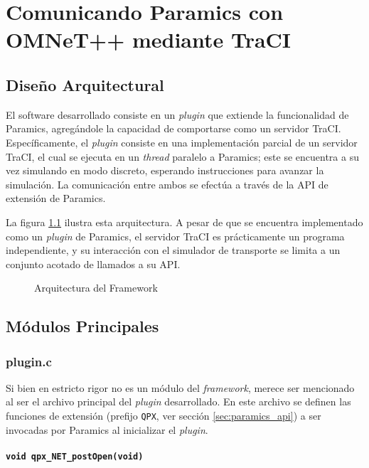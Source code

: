 \chapter{Comunicando Paramics con OMNeT++ mediante TraCI}
\section{Diseño Arquitectural}\label{sec:architecture}

El software desarrollado consiste en un \emph{plugin} que extiende la funcionalidad de Paramics, agregándole la capacidad de comportarse como un servidor TraCI. Específicamente, el \emph{plugin} consiste en una implementación parcial de un servidor TraCI, el cual se ejecuta en un \emph{thread} paralelo a Paramics; este se encuentra a su vez simulando en modo discreto, esperando instrucciones para avanzar la simulación. La comunicación entre ambos se efectúa a través de la API de extensión de Paramics.

La figura \ref{fig:ptraci_arch} ilustra esta arquitectura. A pesar de que se encuentra implementado como un \emph{plugin} de Paramics, el servidor TraCI es prácticamente un programa independiente, y su interacción con el simulador de transporte se limita a un conjunto acotado de llamados a su API.

\begin{figure}[t]
    \centering
    
    \caption{Arquitectura del Framework}
    \label{fig:ptraci_arch}
\end{figure}

\section{Módulos Principales}
\subsection{plugin.c}

Si bien en estricto rigor no es un módulo del \emph{framework}, merece ser mencionado al ser el archivo principal del \emph{plugin} desarrollado. En este archivo se definen las funciones de extensión (prefijo \texttt{QPX}, ver sección \ref{sec:paramics_api}) a ser invocadas por Paramics al inicializar el \emph{plugin}.

\subsubsection{\texttt{void qpx\_NET\_postOpen(void)}}

